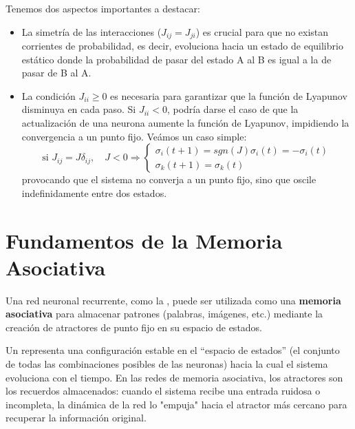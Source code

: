\begin{observacion}
    Tenemos dos aspectos importantes a destacar:
    \begin{itemize}
        \item La simetría de las interacciones ($J_{ij} = J_{ji}$) es crucial para que no existan corrientes de probabilidad, es decir, evoluciona hacia un estado de equilibrio estático donde la probabilidad de pasar del estado A al B es igual a la de pasar de B al A.
        \item La condición $J_{ii} \geq 0$ es necesaria para garantizar que la función de Lyapunov disminuya en cada paso. Si $J_{ii} < 0$, podría darse el caso de que la actualización de una neurona aumente la función de Lyapunov, impidiendo la convergencia a un punto fijo. Veámos un caso simple:
        \begin{equation*}
            \text{si } J_{ij} = J\delta_{ij}, \quad J < 0 \Longrightarrow \begin{cases}
                \sigma_i (t + 1) = sgn(J) \sigma_i (t) = -\sigma_i (t) \\
                \sigma_k (t + 1) = \sigma_k (t)
            \end{cases}
        \end{equation*}
        provocando que el sistema no converja a un punto fijo, sino que oscile indefinidamente entre dos estados.
    \end{itemize}
\end{observacion}

\section{Fundamentos de la Memoria Asociativa}

Una red neuronal recurrente, como la , puede ser utilizada como una \textbf{memoria asociativa} para almacenar patrones (palabras, imágenes, etc.) mediante la creación de atractores de punto fijo en su espacio de estados. 

\begin{definicion}
    Un  representa una configuración estable en el ``espacio de estados'' (el conjunto de todas las combinaciones posibles de las neuronas) hacia la cual el sistema evoluciona con el tiempo. En las redes de memoria asociativa, los atractores son los recuerdos almacenados: cuando el sistema recibe una entrada ruidosa o incompleta, la dinámica de la red lo "empuja" hacia el atractor más cercano para recuperar la información original.

\end{definicion}

